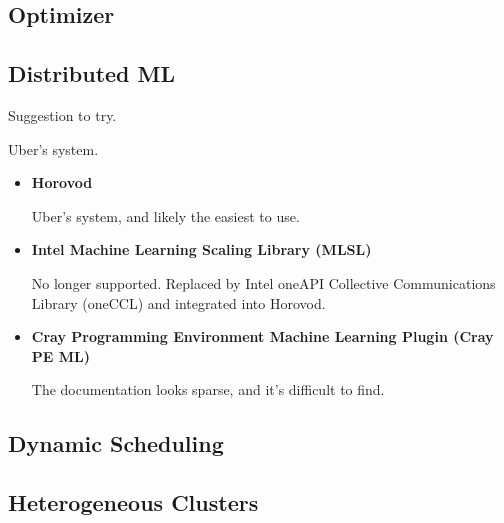 \subsection{Optimizer}


\subsection{Distributed ML}


Suggestion to try.


Uber's system.



\begin{itemize}
  \item \textbf{Horovod}

    Uber's system, and likely the easiest to use.
  \item \textbf{Intel Machine Learning Scaling Library (MLSL)}

    No longer supported. Replaced by Intel oneAPI Collective Communications
    Library (oneCCL) and integrated into Horovod.
  \item \textbf{Cray Programming Environment Machine Learning Plugin (Cray PE
    ML)}

    The documentation looks sparse, and it's difficult to find.
\end{itemize}


\subsection{Dynamic Scheduling}




\subsection{Heterogeneous Clusters}



